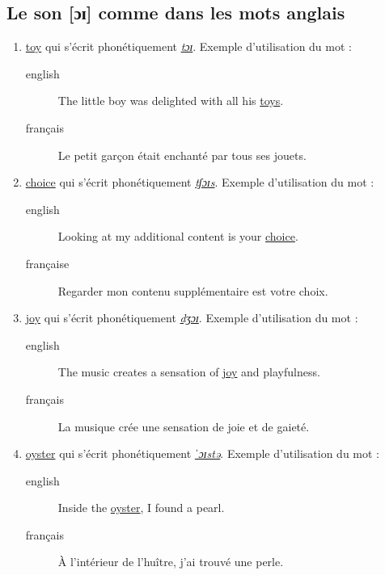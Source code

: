\subsection{Le son [ɔɪ] comme dans les mots anglais}
\label{sec:org4d2fca6}
\begin{enumerate}
\item \href{http://www.wordreference.com/enfr/toy}{toy} qui s'écrit phonétiquement \href{https://en.oxforddictionaries.com/definition/toy}{\emph{tɔɪ}}. Exemple d'utilisation du mot :
\begin{description}
\item[{english}] \textenglish{The little boy was delighted with all his \href{https://youtu.be/1qbuZhVUj\_g}{toys}.}
\item[{français}] Le petit garçon était enchanté par tous ses jouets.
\end{description}
\item \href{http://www.wordreference.com/enfr/choice}{choice} qui s'écrit phonétiquement \href{https://en.oxforddictionaries.com/definition/choice}{\emph{tʃɔɪs}}. Exemple d'utilisation du mot :
\begin{description}
\item[{english}] \textenglish{Looking at my additional content is your \href{https://youtu.be/qBfeK\_IIHag}{choice}.}
\item[{française}] Regarder mon contenu supplémentaire est votre choix.
\end{description}
\item \href{http://www.wordreference.com/enfr/joy}{joy} qui s'écrit phonétiquement \href{https://en.oxforddictionaries.com/definition/joy}{\emph{dʒɔɪ}}. Exemple d'utilisation du mot :
\begin{description}
\item[{english}] \textenglish{The music creates a sensation of \href{https://youtu.be/-GjW1pSYgUk}{joy} and playfulness.}
\item[{français}] La musique crée une sensation de joie et de gaieté.
\end{description}
\item \href{http://www.wordreference.com/enfr/oyster}{oyster} qui s'écrit phonétiquement \href{https://en.oxforddictionaries.com/definition/oyster}{\emph{ˈɔɪstə}}. Exemple d'utilisation du mot :
\begin{description}
\item[{english}] \textenglish{Inside the \href{https://youtu.be/PVn6b9QQZeM}{oyster}, I found a pearl.}
\item[{français}] À l'intérieur de l'huître, j'ai trouvé une perle.
\end{description}
\end{enumerate}
